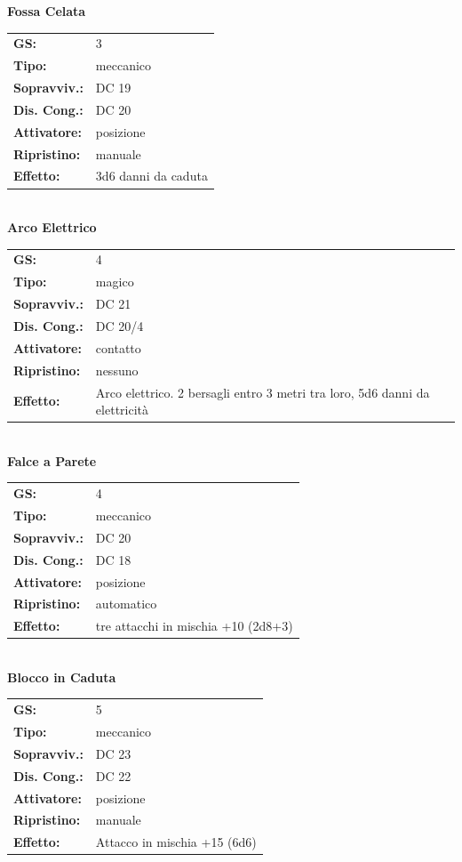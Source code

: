 \begin{multicols}{2}
\textbf{Fossa Celata}

\begin{tabularx}{0.48\textwidth}{lX}
	\textbf{GS:} & 3 \\
	\textbf{Tipo:} & meccanico \\
	\textbf{Sopravviv.:} & DC 19 \\
	\textbf{Dis. Cong.:} & DC 20 \\
	\textbf{Attivatore:} & posizione \\
	\textbf{Ripristino:} & manuale \\
	\textbf{Effetto:} & 3d6 danni da caduta
\end{tabularx}\\

\textbf{Arco Elettrico}

\begin{tabularx}{0.48\textwidth}{lX}
	\textbf{GS:} & 4 \\
	\textbf{Tipo:} & magico \\
	\textbf{Sopravviv.:} & DC 21 \\
	\textbf{Dis. Cong.:} & DC 20/4 \\
	\textbf{Attivatore:} & contatto \\
	\textbf{Ripristino:} & nessuno \\
	\textbf{Effetto:} & Arco elettrico. 2 bersagli entro 3 metri tra loro, 5d6 danni da elettricità 
\end{tabularx}\\

\textbf{Falce a Parete}

\begin{tabularx}{0.48\textwidth}{lX}
	\textbf{GS:} & 4 \\
	\textbf{Tipo:} & meccanico \\
	\textbf{Sopravviv.:} & DC 20 \\
	\textbf{Dis. Cong.:} & DC 18 \\
	\textbf{Attivatore:} & posizione \\
	\textbf{Ripristino:} & automatico \\
	\textbf{Effetto:} & tre attacchi in mischia +10 (2d8+3) 
\end{tabularx}\\

\textbf{Blocco in Caduta}

\begin{tabularx}{0.48\textwidth}{lX}
	\textbf{GS:} & 5 \\
	\textbf{Tipo:} & meccanico \\
	\textbf{Sopravviv.:} & DC 23 \\
	\textbf{Dis. Cong.:} & DC 22 \\
	\textbf{Attivatore:} & posizione \\
	\textbf{Ripristino:} & manuale \\
	\textbf{Effetto:} & Attacco in mischia +15 (6d6) 
\end{tabularx}\\


\end{multicols}
